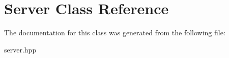 \hypertarget{classServer}{}\section{Server Class Reference}
\label{classServer}


The documentation for this class was generated from the following file\+:\begin{DoxyCompactItemize}
\item 
server.\+hpp\end{DoxyCompactItemize}
